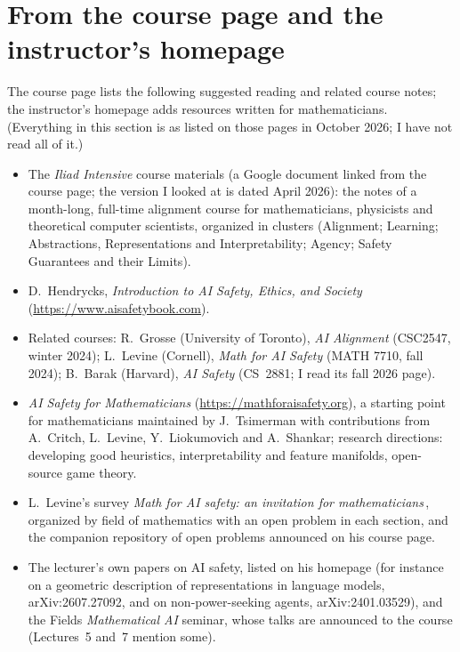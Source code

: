 \section*{From the course page and the instructor's homepage}
The course page lists the following suggested reading and related course notes; the instructor's homepage adds resources written for mathematicians. (Everything in this section is as listed on those pages in October 2026; I have not read all of it.)
\begin{itemize}
  \item The \emph{Iliad Intensive} course materials (a Google document linked from the course page; the version I looked at is dated April 2026): the notes of a month-long, full-time alignment course for mathematicians, physicists and theoretical computer scientists, organized in clusters (Alignment; Learning; Abstractions, Representations and Interpretability; Agency; Safety Guarantees and their Limits).
  \item D.\ Hendrycks, \emph{Introduction to AI Safety, Ethics, and Society} (\url{https://www.aisafetybook.com}).
  \item Related courses: R.\ Grosse (University of Toronto), \emph{AI Alignment} (CSC2547, winter 2024); L.\ Levine (Cornell), \emph{Math for AI Safety} (MATH 7710, fall 2024); B.\ Barak (Harvard), \emph{AI Safety} (CS~2881; I read its fall 2026 page).
  \item \emph{AI Safety for Mathematicians} (\url{https://mathforaisafety.org}), a starting point for mathematicians maintained by J.~Tsimerman with contributions from A.~Critch, L.~Levine, Y.~Liokumovich and A.~Shankar; research directions: developing good heuristics, interpretability and feature manifolds, open-source game theory.
  \item L.\ Levine's survey \emph{Math for AI safety: an invitation for mathematicians}\,\citep{levine2026}, organized by field of mathematics with an open problem in each section, and the companion repository of open problems announced on his course page.
  \item The lecturer's own papers on AI safety, listed on his homepage (for instance on a geometric description of representations in language models, arXiv:2607.27092, and on non-power-seeking agents, arXiv:2401.03529), and the Fields \emph{Mathematical AI} seminar, whose talks are announced to the course (Lectures~5 and~7 mention some).
\end{itemize}

